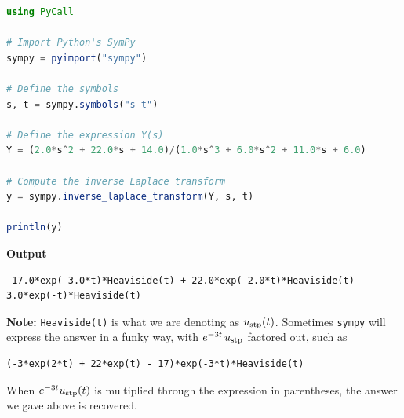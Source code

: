 \begin{lstlisting}[language=Julia,style=mystyle]
using PyCall

# Import Python's SymPy
sympy = pyimport("sympy")

# Define the symbols
s, t = sympy.symbols("s t")

# Define the expression Y(s)
Y = (2.0*s^2 + 22.0*s + 14.0)/(1.0*s^3 + 6.0*s^2 + 11.0*s + 6.0)

# Compute the inverse Laplace transform
y = sympy.inverse_laplace_transform(Y, s, t)

println(y)
\end{lstlisting}
\textbf{Output} 
\begin{verbatim}
-17.0*exp(-3.0*t)*Heaviside(t) + 22.0*exp(-2.0*t)*Heaviside(t) - 3.0*exp(-t)*Heaviside(t)
\end{verbatim}

\vspace*{.2cm}
\textbf{Note:} \texttt{Heaviside(t)} is what we are denoting as $u_{\rm stp}(t)$. Sometimes \texttt{sympy} will express the answer in a funky way, with $e^{-3t}\, u_{\rm stp}$ factored out, such as
\begin{verbatim}
(-3*exp(2*t) + 22*exp(t) - 17)*exp(-3*t)*Heaviside(t)
\end{verbatim}
When $e^{-3t} u_{\rm stp}(t)$ is multiplied through the expression in parentheses, the answer we gave above is recovered.

\Qed 


\vspace*{.2cm}
\vspace*{.2cm}

